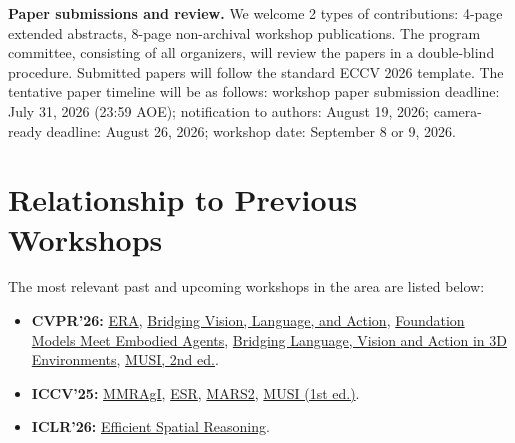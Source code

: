 \documentclass[runningheads]{llncs}
\newcommand{\todo}[1]{{\color{red}#1}}
\begin{document}

\textbf{Paper submissions and review.}
We welcome 2 types of contributions: 
4-page extended abstracts, 8-page non-archival workshop publications. The program committee, consisting of all organizers, will review the papers in a double-blind procedure. Submitted papers will follow the standard ECCV 2026 template.
The tentative paper timeline will be as follows: workshop paper submission deadline: July 31, 2026 (23:59 AOE); notification to authors: August 19, 2026; camera-ready deadline: August 26, 2026; workshop date: September 8 or 9, 2026. 

\vspace{-1em}
\section{Relationship to Previous Workshops}

\vspace{-1.5em}
The most relevant past and upcoming workshops in the area are listed below:

\vspace{-.75em}
\begin{itemize}
\item \textbf{CVPR'26:} \href{https://embodied-reasoning.github.io/}{ERA}, \href{https://activis-workshop.github.io/}{Bridging Vision, Language, and Action}, \href{https://foundation-models-meet-embodied-agents.github.io/cvpr2026/}{Foundation Models Meet Embodied Agents}, \href{https://3d-llm-vla.github.io/}{Bridging Language, Vision and Action in 3D Environments}, \href{https://musi-workshop.github.io/}{MUSI, 2nd ed.}.
\item \textbf{ICCV'25:} \href{https://agent-intelligence.github.io/agent-intelligence/}{MMRAgI}, \href{https://esr-2025.github.io/}{ESR}, \href{https://mars2workshop.github.io/iccv2025/}{MARS2}, \href{https://musi-workshop.github.io/}{MUSI (1st ed.)}.
\item \textbf{ICLR'26:} \href{https://sites.google.com/ucsd.edu/efficient-spatial-reasoning/}{Efficient Spatial Reasoning}.
\end{itemize}
\end{document}
